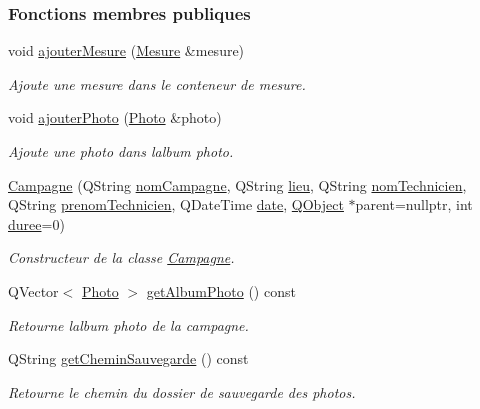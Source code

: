 \subsubsection*{Fonctions membres publiques}
\begin{DoxyCompactItemize}
\item 
void \hyperlink{class_campagne_ab301ceaacbe1186682c2b6f3282619d0}{ajouter\+Mesure} (\hyperlink{struct_mesure}{Mesure} \&mesure)
\begin{DoxyCompactList}\small\item\em Ajoute une mesure dans le conteneur de mesure. \end{DoxyCompactList}\item 
void \hyperlink{class_campagne_a472029bf46646d136a750dbaa7a3155f}{ajouter\+Photo} (\hyperlink{struct_photo}{Photo} \&photo)
\begin{DoxyCompactList}\small\item\em Ajoute une photo dans l\textquotesingle{}album photo. \end{DoxyCompactList}\item 
\hyperlink{class_campagne_aba78ce7d7b921053abc69e22789ec6da}{Campagne} (Q\+String \hyperlink{class_campagne_a4455078418041442fa3998b9b6cb6230}{nom\+Campagne}, Q\+String \hyperlink{class_campagne_a1df66832d5d700bfd2bd36fe548f7cba}{lieu}, Q\+String \hyperlink{class_campagne_a6d3e88fb93b38cbcf1bc53cc9fc30f2f}{nom\+Technicien}, Q\+String \hyperlink{class_campagne_a9cc37c9671136683b5dac87ff34017bc}{prenom\+Technicien}, Q\+Date\+Time \hyperlink{class_campagne_ac8180e3e533648770c4e6d9a182fe3ed}{date}, \hyperlink{class_q_object}{Q\+Object} $\ast$parent=nullptr, int \hyperlink{class_campagne_a4fb4cb286275103c9b6946e25e301fbf}{duree}=0)
\begin{DoxyCompactList}\small\item\em Constructeur de la classe \hyperlink{class_campagne}{Campagne}. \end{DoxyCompactList}\item 
Q\+Vector$<$ \hyperlink{struct_photo}{Photo} $>$ \hyperlink{class_campagne_abec90fcbc0c4ded45caaac9adb454add}{get\+Album\+Photo} () const
\begin{DoxyCompactList}\small\item\em Retourne l\textquotesingle{}album photo de la campagne. \end{DoxyCompactList}\item 
Q\+String \hyperlink{class_campagne_ad752790357417d83a93056d9c9689a16}{get\+Chemin\+Sauvegarde} () const
\begin{DoxyCompactList}\small\item\em Retourne le chemin du dossier de sauvegarde des photos. \end{DoxyCompactList}\item 

\end{DoxyCompactItemize}
